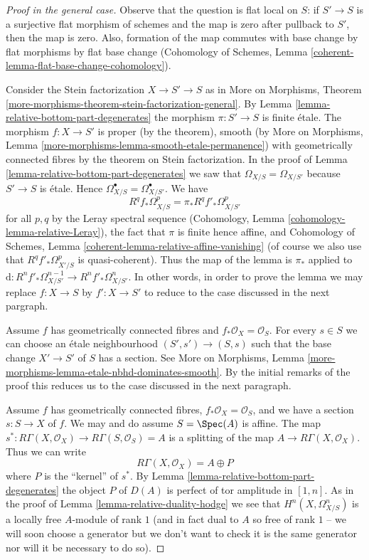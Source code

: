 \begin{proof}[Proof in the general case]
Observe that the question is flat local on $S$: if $S' \to S$ is a surjective
flat morphism of schemes and the map is zero after pullback to $S'$,
then the map is zero. Also, formation of the map commutes with base change
by flat morphisms by flat base change (Cohomology of Schemes, Lemma
\ref{coherent-lemma-flat-base-change-cohomology}).

\medskip\noindent
Consider the Stein factorization $X \to S' \to S$ as in
More on Morphisms, Theorem
\ref{more-morphisms-theorem-stein-factorization-general}.
By Lemma \ref{lemma-relative-bottom-part-degenerates} the morphism
$\pi : S' \to S$ is finite \'etale.
The morphism $f : X \to S'$ is proper (by the theorem),
smooth (by More on Morphisms, Lemma
\ref{more-morphisms-lemma-smooth-etale-permanence}) with geometrically
connected fibres by the theorem on Stein factorization.
In the proof of Lemma \ref{lemma-relative-bottom-part-degenerates}
we saw that $\Omega_{X/S} = \Omega_{X/S'}$ because $S' \to S$ is \'etale.
Hence $\Omega^\bullet_{X/S} = \Omega^\bullet_{X/S'}$.
We have
$$
R^qf_*\Omega^p_{X/S} = \pi_*R^qf'_*\Omega^p_{X/S'}
$$
for all $p, q$ by the Leray spectral sequence
(Cohomology, Lemma \ref{cohomology-lemma-relative-Leray}),
the fact that $\pi$ is finite hence affine, and
Cohomology of Schemes, Lemma \ref{coherent-lemma-relative-affine-vanishing}
(of course we also use that $R^qf'_*\Omega^p_{X'/S}$ is
quasi-coherent).
Thus the map of the lemma is $\pi_*$ applied to
$\text{d} : R^nf'_*\Omega^{n - 1}_{X/S'} \to R^nf'_*\Omega^n_{X/S'}$.
In other words, in order to prove the lemma we may replace
$f : X \to S$ by $f' : X \to S'$ to reduce to the case discussed
in the next pargraph.

\medskip\noindent
Assume $f$ has geometrically connected fibres and
$f_*\mathcal{O}_X = \mathcal{O}_S$.
For every $s \in S$ we can choose an \'etale neighbourhood
$(S', s') \to (S, s)$ such that the base change $X' \to S'$ of $S$
has a section. See More on Morphisms, Lemma
\ref{more-morphisms-lemma-etale-nbhd-dominates-smooth}.
By the initial remarks of the proof this reduces us to the case
discussed in the next paragraph.

\medskip\noindent
Assume $f$ has geometrically connected fibres,
$f_*\mathcal{O}_X = \mathcal{O}_S$, and we have
a section $s : S \to X$ of $f$. We may and do assume $S = \Spec(A)$
is affine. The map
$s^* : R\Gamma(X, \mathcal{O}_X) \to R\Gamma(S, \mathcal{O}_S) = A$
is a splitting of the map $A \to R\Gamma(X, \mathcal{O}_X)$. Thus we can write
$$
R\Gamma(X, \mathcal{O}_X) = A \oplus P
$$
where $P$ is the ``kernel'' of $s^*$. By
Lemma \ref{lemma-relative-bottom-part-degenerates} the object $P$
of $D(A)$ is perfect of tor amplitude in $[1, n]$. As in the proof
of Lemma \ref{lemma-relative-duality-hodge} we see that
$H^n(X, \Omega^n_{X/S})$ is a locally free $A$-module of rank $1$
(and in fact dual to $A$ so free of rank $1$ -- we will soon choose
a generator but we don't want to check it is the same generator
nor will it be necessary to do so).


\end{proof}
